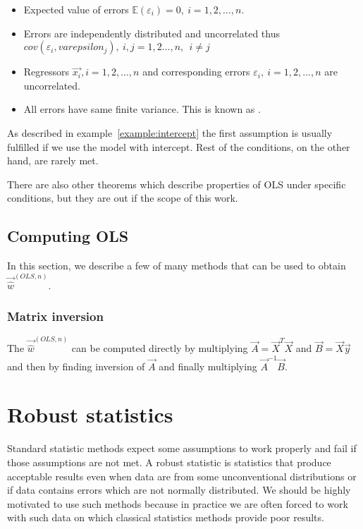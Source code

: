 \begin{itemize} \label{ols:assumptions}
  \item Expected value of errors $\mathbb{E}(\varepsilon_i) = 0, \ i = 1,2, \ldots , n$.
  \item Errors are independently distributed and uncorrelated thus \\ $cov(\varepsilon_i, varepsilon_j), \ i, j = 1, 2 \ldots , n, \ \ i \neq j$
  \item Regressors $\vec{x_i}, i = 1, 2, \ldots , n$ and corresponding errors 
$\varepsilon_i, \ i = 1,2, \ldots , n$ are uncorrelated.
 \item All errors have same finite variance. This is known as .
\end{itemize}

\begin{note}
 As described in example~\ref{example:intercept} the first assumption is usually fulfilled if we use the model with intercept. Rest of the conditions, on the other hand, are rarely met.
\end{note}

There are also other theorems which describe properties of OLS under specific conditions, but they are out if the scope of this work.

\subsection{Computing OLS}
In this section, we describe a few of many methods that can be used to obtain  $\vec{\hat{w}}^{(OLS,n)}$. 

\subsubsection*{Matrix inversion}
The $\vec{\hat{w}}^{(OLS,n)}$ can be computed directly by multiplying $\vec{A} = \vec{X}^T\vec{X}$ and $\vec{B} = \vec{X}\vec{y}$ and then by finding inversion of $\vec{A}$  and finally multiplying $\vec{A}^{-1}\vec{B}$.




\section{Robust statistics} \label{section:roboust}
Standard statistic methods expect some assumptions to work properly and fail if those assumptions are not met. A robust statistic is statistics that produce acceptable results even when data are from some unconventional distributions or if data contains errors which are not normally distributed. We should be highly motivated to use such methods because in practice we are often forced to work with such data on which classical statistics methods provide poor results.

